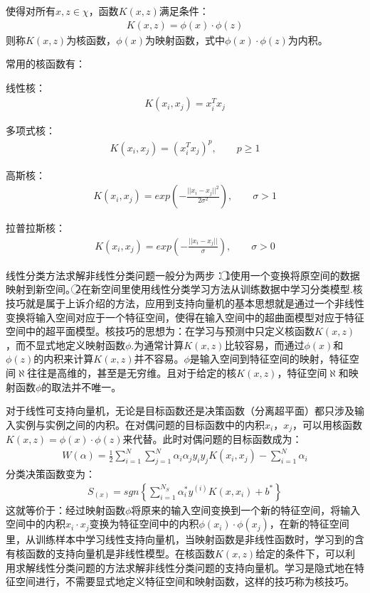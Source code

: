 \documentclass[12pt,a4paper]{article}%
\begin{document}
	使得对所有$x,z\in\chi$，函数$K(x,z)$满足条件：
	\begin{align}
		K(x,z)=\phi(x)·\phi(z)
	\end{align}
	则称$K(x,z)$为核函数，$\phi(x)$为映射函数，式中$\phi(x)·\phi(z)$为内积。
	
	常用的核函数有：
	
	线性核：
	\begin{align}
		K({x}_{i},{x}_{j})={x}_{i}^{T}{x}_{j}
	\end{align}
	
	多项式核：
	\begin{align}
		K({x}_{i},{x}_{j})={({x}_{i}^{T}{x}_{j})}^{p}  ,\qquad p\geq1
	\end{align}
	
	高斯核：
	\begin{align}
		K({x}_{i},{x}_{j})=exp(-\frac{{||{x}_{i}-{x}_{j}||}^{2}}{2{\sigma}^{2}}),\qquad\sigma>1
	\end{align}
	
	拉普拉斯核：
	\begin{align}
		K({x}_{i},{x}_{j})=exp(-\frac{||{x}_{i}-{x}_{j}||}{\sigma}),\qquad\sigma>0
	\end{align}
	
	线性分类方法求解非线性分类问题一般分为两步：\textcircled{1}使用一个变换将原空间的数据映射到新空间。\textcircled{2}在新空间里使用线性分类学习方法从训练数据中学习分类模型.核技巧就是属于上诉介绍的方法，应用到支持向量机的基本思想就是通过一个非线性变换将输入空间对应于一个特征空间，使得在输入空间中的超曲面模型对应于特征空间中的超平面模型。核技巧的思想为：在学习与预测中只定义核函数$K(x,z)$，而不显式地定义映射函数$\phi$.为通常计算$K(x,z)$比较容易，而通过$\phi(x)$和$\phi(z)$的内积来计算$K(x,z)$并不容易。$\phi$是输入空间到特征空间的映射，特征空间$\aleph$往往是高维的，甚至是无穷维。且对于给定的核$K(x,z)$，特征空间$\aleph$和映射函数$\phi$的取法并不唯一。
	
	对于线性可支持向量机，无论是目标函数还是决策函数（分离超平面）都只涉及输入实例与实例之间的内积。在对偶问题的目标函数中的内积${x}_{i}$，${x}_{j}$，可以用核函数$K(x,z)=\phi(x)·\phi(z)$来代替。此时对偶问题的目标函数成为：
	\begin{align}
		W(\alpha)=\frac{1}{2}\sum_{i=1}^{N} {\sum_{j=1}^{N} {{\alpha}_{i}{\alpha}_{j}{y}_{i}{y}_{j}K({x}_{i},{x}_{j})}}-\sum_{i=1}^{N} {\alpha}_{i}
	\end{align}
	分类决策函数变为：
	\begin{align}
		{S}_{(x)}=sgn\left\{\sum_{i=1}^{{N}_{S}} {\alpha}_{i}^{*}{y}^{(i)}K(x,{x}_{i})+{b}^{*}\right\}
	\end{align}
	这就等价于：经过映射函数$\phi$将原来的输入空间变换到一个新的特征空间，将输入空间中的内积${x}_{i}·{x}_{j}$变换为特征空间中的内积$\phi({x}_{i})·\phi({x}_{j})$，在新的特征空间里，从训练样本中学习线性支持向量机，当映射函数是非线性函数时，学习到的含有核函数的支持向量机是非线性模型。在核函数$K(x,z)$给定的条件下，可以利用求解线性分类问题的方法求解非线性分类问题的支持向量机。学习是隐式地在特征空间进行，不需要显式地定义特征空间和映射函数，这样的技巧称为核技巧。
\end{document}
